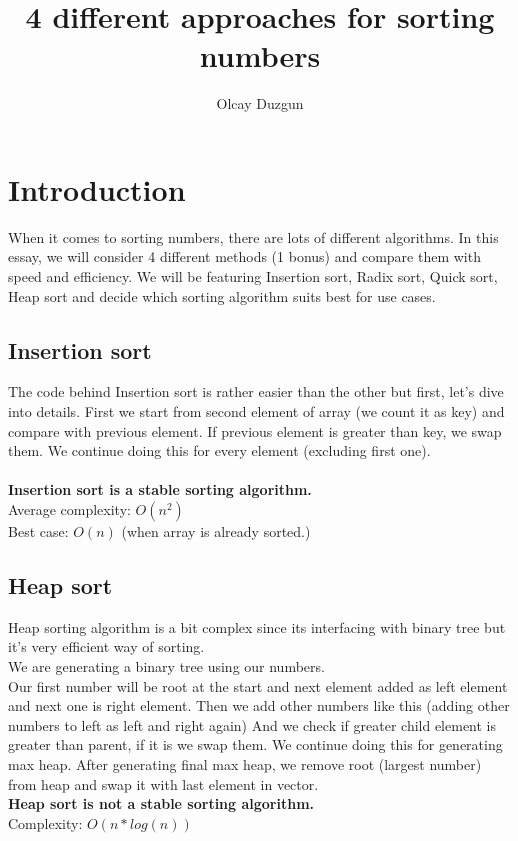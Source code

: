 \documentclass{article}
\title{4 different approaches for sorting numbers}
\author{Olcay Duzgun}
\begin{document}
\maketitle

\section{Introduction}

When it comes to sorting numbers, there are lots of different algorithms. In this essay, we will consider 4 different methods (1 bonus) and compare them with speed and efficiency.
We will be featuring Insertion sort, Radix sort, Quick sort, Heap sort and decide which sorting algorithm suits best for use cases.

\subsection{Insertion sort}
The code behind Insertion sort is rather easier than the other but first, let's dive into details.
First we start from second element of array (we count it as key) and compare with previous element.
If previous element is greater than key, we swap them.
We continue doing this for every element (excluding first one).\\
\\\textbf{Insertion sort is a stable sorting algorithm.}\\
Average complexity: $O(n^2)$\\
Best case: $O(n)$ (when array is already sorted.)\\

\subsection{Heap sort}
Heap sorting algorithm is a bit complex since its interfacing with binary tree but it's very efficient way of sorting.\\
We are generating a binary tree using our numbers.\\
Our first number will be root at the start and next element added as left element and next one is right element.
Then we add other numbers like this (adding other numbers to left as left and right again)
And we check if greater child element is greater than parent, if it is we swap them.
We continue doing this for generating max heap.
After generating final max heap,
we remove root (largest number) from heap and swap it with last element in vector.
\\\textbf{Heap sort is not a stable sorting algorithm.}\\
Complexity: $O(n * log(n))$\\
\end{document}
